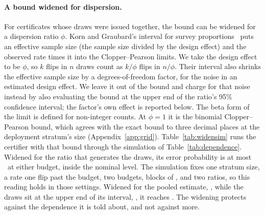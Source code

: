 \paragraph{A bound widened for dispersion.} For certificates whose draws
were issued together, the bound can be widened for a dispersion ratio
$\phi$. Korn and Graubard's interval for survey
proportions~\cite{korngraubard} puts an effective sample size (the
sample size divided by the design effect) and the observed rate times it
into the Clopper--Pearson limits. We take the design effect to be
$\phi$, so $k$ flips in $n$ draws count as $k/\phi$ flips in $n/\phi$.
Their interval also shrinks the effective sample size by a
degrees-of-freedom factor, for the noise in an estimated design effect.
We leave it out of the bound and charge for that noise instead by also
evaluating the bound at the upper end of the ratio's
95\% confidence interval; the factor's own effect is reported below. The beta
form of the limit is defined for non-integer counts. At $\phi=1$
it is the binomial Clopper--Pearson bound, which agrees with the exact
bound to three decimal places at the deployment stratum's size
(Appendix~\ref{app:grid}). Table~\ref{tab:widensim} runs the certifier
with that bound through the simulation of Table~\ref{tab:dependence}.
Widened for the ratio that generates the draws, its error probability is
at most \widenMatchedMax\ at either budget, inside the nominal level.
The simulation fixes one stratum size, a rate one flip past the budget,
two budgets, blocks of \indepBlockSize, and two ratios, so this reading
holds in those settings.
Widened for the pooled estimate, \indepPooledDispersion, while the draws
sit at the upper end of its interval, \indepPooledDispersionHi, it
reaches \widenMismatchMax. The widening protects against the dependence
it is told about, and not against more.

